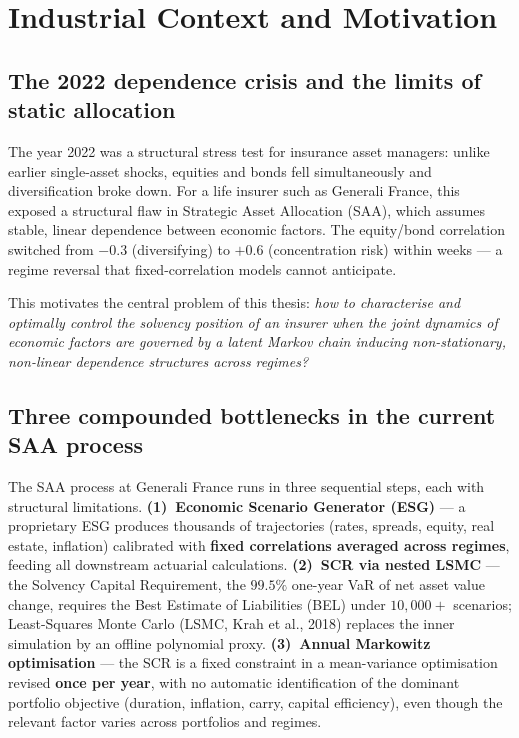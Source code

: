 \documentclass[11pt,a4paper]{article}
\begin{document}
\section{Industrial Context and Motivation}

\subsection{The 2022 dependence crisis and the limits of static allocation}

The year 2022 was a structural stress test for insurance asset managers: unlike
earlier single-asset shocks, equities and bonds fell simultaneously and
diversification broke down. For a life insurer such as Generali France, this
exposed a structural flaw in Strategic Asset Allocation (SAA), which assumes
stable, linear dependence between economic factors. The equity/bond correlation
switched from $-0.3$ (diversifying) to $+0.6$ (concentration risk) within
weeks --- a regime reversal that fixed-correlation models cannot anticipate.

This motivates the central problem of this thesis:
\textit{how to characterise and optimally control the solvency position of an insurer
when the joint dynamics of economic factors are governed by a latent Markov chain
inducing non-stationary, non-linear dependence structures across regimes?}

\subsection{Three compounded bottlenecks in the current SAA process}

The SAA process at Generali France runs in three sequential steps, each with
structural limitations.
\textbf{(1)~Economic Scenario Generator (ESG)} --- a proprietary ESG produces
thousands of trajectories (rates, spreads, equity, real estate, inflation)
calibrated with \textbf{fixed correlations averaged across regimes}, feeding all
downstream actuarial calculations.
\textbf{(2)~SCR via nested LSMC} --- the Solvency Capital Requirement, the
$99.5\%$ one-year VaR of net asset value change, requires the Best Estimate of
Liabilities (BEL) under $10{,}000+$ scenarios; Least-Squares Monte Carlo
(LSMC, Krah et al., 2018) replaces the inner simulation by an offline
polynomial proxy.
\textbf{(3)~Annual Markowitz optimisation} --- the SCR is a fixed constraint in
a mean-variance optimisation revised \textbf{once per year}, with no automatic
identification of the dominant portfolio objective (duration, inflation, carry,
capital efficiency), even though the relevant factor varies across portfolios
and regimes.
\end{document}
